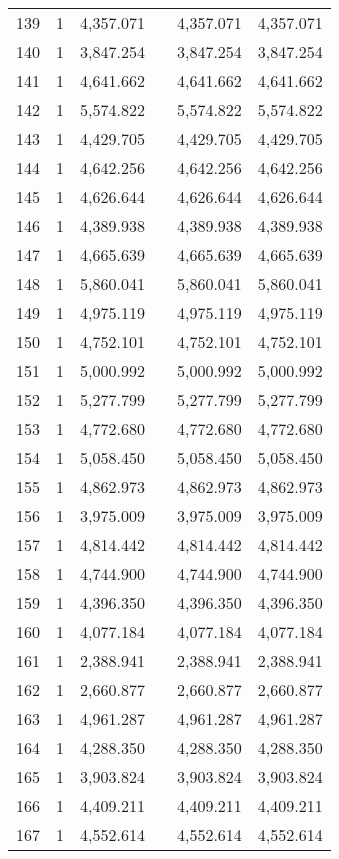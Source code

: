 \begin{table}[!htbp]
\begin{tabular}{@{\extracolsep{5pt}}lccccc}
139 & 1 & 4,357.071 &  & 4,357.071 & 4,357.071 \\ 
140 & 1 & 3,847.254 &  & 3,847.254 & 3,847.254 \\ 
141 & 1 & 4,641.662 &  & 4,641.662 & 4,641.662 \\ 
142 & 1 & 5,574.822 &  & 5,574.822 & 5,574.822 \\ 
143 & 1 & 4,429.705 &  & 4,429.705 & 4,429.705 \\ 
144 & 1 & 4,642.256 &  & 4,642.256 & 4,642.256 \\ 
145 & 1 & 4,626.644 &  & 4,626.644 & 4,626.644 \\ 
146 & 1 & 4,389.938 &  & 4,389.938 & 4,389.938 \\ 
147 & 1 & 4,665.639 &  & 4,665.639 & 4,665.639 \\ 
148 & 1 & 5,860.041 &  & 5,860.041 & 5,860.041 \\ 
149 & 1 & 4,975.119 &  & 4,975.119 & 4,975.119 \\ 
150 & 1 & 4,752.101 &  & 4,752.101 & 4,752.101 \\ 
151 & 1 & 5,000.992 &  & 5,000.992 & 5,000.992 \\ 
152 & 1 & 5,277.799 &  & 5,277.799 & 5,277.799 \\ 
153 & 1 & 4,772.680 &  & 4,772.680 & 4,772.680 \\ 
154 & 1 & 5,058.450 &  & 5,058.450 & 5,058.450 \\ 
155 & 1 & 4,862.973 &  & 4,862.973 & 4,862.973 \\ 
156 & 1 & 3,975.009 &  & 3,975.009 & 3,975.009 \\ 
157 & 1 & 4,814.442 &  & 4,814.442 & 4,814.442 \\ 
158 & 1 & 4,744.900 &  & 4,744.900 & 4,744.900 \\ 
159 & 1 & 4,396.350 &  & 4,396.350 & 4,396.350 \\ 
160 & 1 & 4,077.184 &  & 4,077.184 & 4,077.184 \\ 
161 & 1 & 2,388.941 &  & 2,388.941 & 2,388.941 \\ 
162 & 1 & 2,660.877 &  & 2,660.877 & 2,660.877 \\ 
163 & 1 & 4,961.287 &  & 4,961.287 & 4,961.287 \\ 
164 & 1 & 4,288.350 &  & 4,288.350 & 4,288.350 \\ 
165 & 1 & 3,903.824 &  & 3,903.824 & 3,903.824 \\ 
166 & 1 & 4,409.211 &  & 4,409.211 & 4,409.211 \\ 
167 & 1 & 4,552.614 &  & 4,552.614 & 4,552.614 \\ 

\end{tabular}
\end{table}
